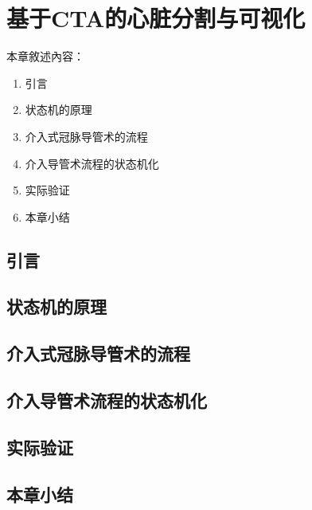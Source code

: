 \chapter{基于CTA的心脏分割与可视化}
\label{chap7}

本章敘述內容：
\begin{enumerate}
  \item 引言
  \item 状态机的原理
  \item 介入式冠脉导管术的流程
  \item 介入导管术流程的状态机化
  \item 实际验证
  \item 本章小结
\end{enumerate}

\section{引言}

\section{状态机的原理}

\section{介入式冠脉导管术的流程}

\section{介入导管术流程的状态机化}

\section{实际验证}

\section{本章小结} 